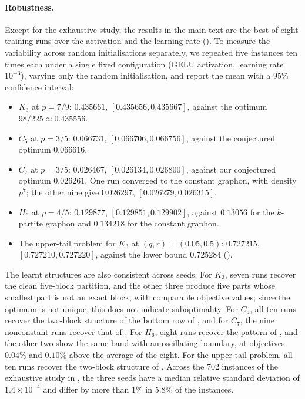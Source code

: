 \documentclass{article}
\theoremstyle{plain}
\theoremstyle{definition}
\theoremstyle{remark}
\begin{document}
\paragraph{Robustness.}
Except for the exhaustive study, the results in the main text are the best of eight training runs over the activation and the learning rate (). To measure the variability across random initialisations separately, we repeated five instances ten times each under a single fixed configuration (GELU activation, learning rate $10^{-3}$), varying only the random initialisation, and report the mean with a $95\%$ confidence interval:
\begin{itemize}
  \item $K_3$ at $p = 7/9$: $0.435661$, $[0.435656, 0.435667]$, against the optimum $98/225 \approx 0.435556$.
  \item $C_5$ at $p = 3/5$: $0.066731$, $[0.066706, 0.066756]$, against the conjectured optimum $0.066616$.
  \item $C_7$ at $p = 3/5$: $0.026467$, $[0.026134, 0.026800]$, against our conjectured optimum $0.026261$. One run converged to the constant graphon, with density $p^7$; the other nine give $0.026297$, $[0.026279, 0.026315]$.
  \item $H_6$ at $p = 4/5$: $0.129877$, $[0.129851, 0.129902]$, against $0.13056$ for the $k$-partite graphon and $0.134218$ for the constant graphon.
  \item The upper-tail problem for $K_3$ at $(q, r) = (0.05, 0.5)$: $0.727215$, $[0.727210, 0.727220]$, against the lower bound $0.725284$ ().
\end{itemize}
The learnt structures are also consistent across seeds. For $K_3$, seven runs recover the clean five-block partition, and the other three produce five parts whose smallest part is not an exact block, with comparable objective values; since the optimum is not unique, this does not indicate suboptimality. For $C_5$, all ten runs recover the two-block structure of the bottom row of , and for $C_7$, the nine nonconstant runs recover that of . For $H_6$, eight runs recover the pattern of , and the other two show the same band with an oscillating boundary, at objectives $0.04\%$ and $0.10\%$ above the average of the eight. For the upper-tail problem, all ten runs recover the two-block structure of .
Across the 702 instances of the exhaustive study in , the three seeds have a median relative standard deviation of $1.4 \times 10^{-4}$ and differ by more than $1\%$ in $5.8\%$ of the instances.
\end{document}
